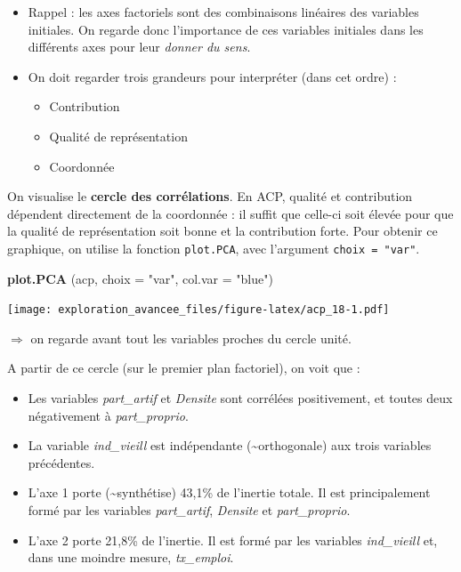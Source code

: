 \documentclass[]{book}
\newenvironment{Shaded}{\begin{snugshade}}{\end{snugshade}}
\newcommand{\DataTypeTok}[1]{\textcolor[rgb]{0.13,0.29,0.53}{#1}}
\newcommand{\KeywordTok}[1]{\textcolor[rgb]{0.13,0.29,0.53}{\textbf{#1}}}
\newcommand{\NormalTok}[1]{#1}
\newcommand{\StringTok}[1]{\textcolor[rgb]{0.31,0.60,0.02}{#1}}
\providecommand{\tightlist}{%
  \setlength{\itemsep}{0pt}\setlength{\parskip}{0pt}}
\begin{document}
\begin{itemize}
\tightlist
\item
  Rappel : les axes factoriels sont des combinaisons linéaires des variables initiales. On regarde donc l'importance de ces variables initiales dans les différents axes pour leur \emph{donner du sens}.
\item
  On doit regarder trois grandeurs pour interpréter (dans cet ordre) :

  \begin{itemize}
  \tightlist
  \item
    Contribution
  \item
    Qualité de représentation
  \item
    Coordonnée
  \end{itemize}
\end{itemize}

On visualise le \textbf{cercle des corrélations}. En ACP, qualité et contribution dépendent directement de la coordonnée : il suffit que celle-ci soit élevée pour que la qualité de représentation soit bonne et la contribution forte.
Pour obtenir ce graphique, on utilise la fonction \texttt{plot.PCA}, avec l'argument \texttt{choix\ =\ "var"}.

\begin{Shaded}
\begin{Highlighting}[]
\KeywordTok{plot.PCA}\NormalTok{ (acp, }\DataTypeTok{choix =} \StringTok{"var"}\NormalTok{, }\DataTypeTok{col.var =} \StringTok{"blue"}\NormalTok{)}
\end{Highlighting}
\end{Shaded}

\texttt{[image: exploration\_avancee\_files/figure-latex/acp\_18-1.pdf]}

\(\Rightarrow\) on regarde avant tout les variables proches du cercle unité.

A partir de ce cercle (sur le premier plan factoriel), on voit que :

\begin{itemize}
\tightlist
\item
  Les variables \emph{part\_artif} et \emph{Densite} sont corrélées positivement, et toutes deux négativement à \emph{part\_proprio}.
\item
  La variable \emph{ind\_vieill} est indépendante (\textasciitilde{}orthogonale) aux trois variables précédentes.
\item
  L'axe 1 porte (\textasciitilde{}synthétise) 43,1\% de l'inertie totale. Il est principalement formé par les variables \emph{part\_artif}, \emph{Densite} et \emph{part\_proprio}.
\item
  L'axe 2 porte 21,8\% de l'inertie. Il est formé par les variables \emph{ind\_vieill} et, dans une moindre mesure, \emph{tx\_emploi}.
\end{itemize}
\end{document}
